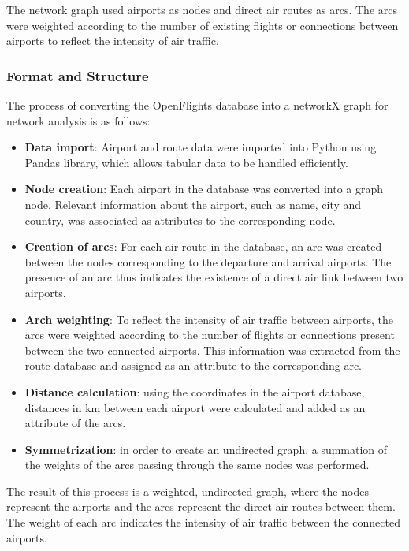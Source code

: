 \documentclass[12pt]{article}
\begin{document}
    The network graph used airports as nodes and direct air routes as arcs. The arcs were weighted according to the number of existing flights or connections between airports to reflect the intensity of air traffic.

    \subsubsection{Format and Structure}
    The process of converting the OpenFlights database into a networkX graph for network analysis is as follows:
    \begin{itemize}
        \item \textbf{Data import}: Airport and route data were imported into Python using Pandas library, which allows tabular data to be handled efficiently.
        \item \textbf{Node creation}: Each airport in the database was converted into a graph node. Relevant information about the airport, such as name, city and country, was associated as attributes to the corresponding node.
        \item \textbf{Creation of arcs}: For each air route in the database, an arc was created between the nodes corresponding to the departure and arrival airports. The presence of an arc thus indicates the existence of a direct air link between two airports.
        \item \textbf{Arch weighting}: To reflect the intensity of air traffic between airports, the arcs were weighted according to the number of flights or connections present between the two connected airports. This information was extracted from the route database and assigned as an attribute to the corresponding arc.
        \item \textbf{Distance calculation}: using the coordinates in the airport database, distances in km between each airport were calculated and added as an attribute of the arcs.
        \item \textbf{Symmetrization}: in order to create an undirected graph, a summation of the weights of the arcs passing through the same nodes was performed.
    \end{itemize}
    The result of this process is a weighted, undirected graph, where the nodes represent the airports and the arcs represent the direct air routes between them. The weight of each arc indicates the intensity of air traffic between the connected airports.
\end{document}

